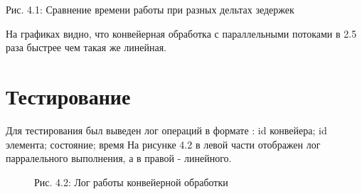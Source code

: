 \documentclass[12pt]{report}
\begin{document}

\begin{center}
 Рис. 4.1: Сравнение времени работы при разных дельтах зедержек
\end{center}


На графиках видно, что конвейерная обработка с параллельными потоками в 2.5 раза быстрее чем такая же линейная.

\section{Тестирование}
Для тестирования был выведен лог операций в формате : 
id конвейера; id элемента; состояние; время
На рисунке 4.2 в левой части отображен лог парралельного выполнения, а в правой - линейного.

\begin{figure}[h]
	\label{fig:v_st}
	\begin{center}
Рис. 4.2: Лог работы конвейерной обработки
\end{center}
\end{figure}
\end{document}
